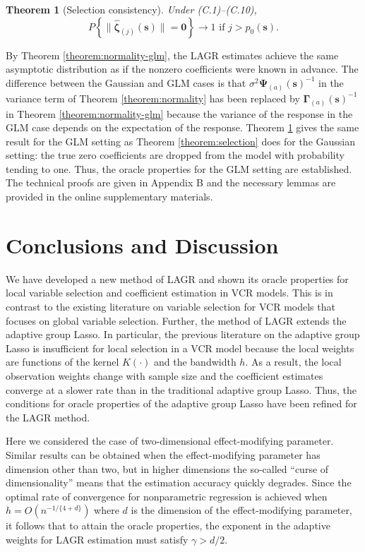 \documentclass[authoryear,review, 12pt]{elsarticle}
\newtheorem{thm}{Theorem}
\begin{document}
\begin{thm}[Selection consistency]
\label{theorem:selection-glm}  Under (C.1)--(C.10),
\[
P\left\{ \|\hat{\bm{\zeta}}_{(j)}(\bm{s})\|=\bm{0}\right\} \to1\text{ if }j>p_{0}(\bm{s}).
\]
 
\end{thm}
By Theorem \ref{theorem:normality-glm}, the LAGR estimates achieve
the same asymptotic distribution as if the nonzero coefficients were
known in advance. The difference between the Gaussian and GLM cases
is that $\sigma^{2}\bm{\Psi}_{(a)}(\bm{s})^{-1}$ in the variance
term of Theorem \ref{theorem:normality} has been replaced by $\bm{\Gamma}_{(a)}(\bm{s})^{-1}$
in Theorem \ref{theorem:normality-glm} because the variance of the
response in the GLM case depends on the expectation of the response.
Theorem \ref{theorem:selection-glm} gives the same result for the
GLM setting as Theorem \ref{theorem:selection} does for the Gaussian
setting: the true zero coefficients are dropped from the model with
probability tending to one. Thus, the oracle properties for the GLM
setting are established. The technical proofs are given in Appendix
B and the necessary lemmas are provided in the online supplementary
materials.


\section{Conclusions and Discussion \label{section-conclusion}}

We have developed a new method of LAGR and shown its oracle properties
for local variable selection and coefficient estimation in VCR models.
This is in contrast to the existing literature on variable selection
for VCR models that focuses on global variable selection. Further,
the method of LAGR extends the adaptive group Lasso. In particular,
the previous literature on the adaptive group Lasso is insufficient
for local selection in a VCR model because the local weights are functions
of the kernel $K(\cdot)$ and the bandwidth $h$. As a result, the
local observation weights change with sample size and the coefficient
estimates converge at a slower rate than in the traditional adaptive
group Lasso. Thus, the conditions for oracle properties of the adaptive
group Lasso have been refined for the LAGR method.

Here we considered the case of two-dimensional effect-modifying parameter.
Similar results can be obtained when the effect-modifying parameter
has dimension other than two, but in higher dimensions the so-called
``curse of dimensionality'' means that the estimation accuracy quickly
degrades. Since the optimal rate of convergence for nonparametric
regression is achieved when $h=O\left(n^{-1/\{4+d\}}\right)$ where
$d$ is the dimension of the effect-modifying parameter, it follows
that to attain the oracle properties, the exponent in the adaptive
weights for LAGR estimation must satisfy $\gamma>d/2$.
\end{document}
